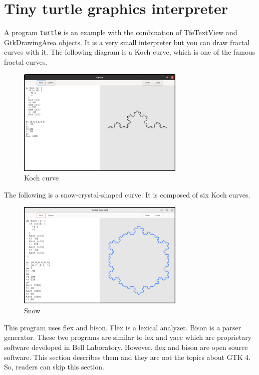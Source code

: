 \section{Tiny turtle graphics
interpreter}\label{tiny-turtle-graphics-interpreter}

A program \passthrough{\lstinline!turtle!} is an example with the
combination of TfeTextView and GtkDrawingArea objects. It is a very
small interpreter but you can draw fractal curves with it. The following
diagram is a Koch curve, which is one of the famous fractal curves.

\begin{figure}
\centering
\includegraphics[width=8cm,height=5.11cm]{../src/turtle/image/turtle_koch.png}
\caption{Koch curve}
\end{figure}

The following is a snow-crystal-shaped curve. It is composed of six Koch
curves.

\begin{figure}
\centering
\includegraphics[width=8cm,height=5.11cm]{../image/turtle_snow.png}
\caption{Snow}
\end{figure}

This program uses flex and bison. Flex is a lexical analyzer. Bison is a
parser generator. These two programs are similar to lex and yacc which
are proprietary software developed in Bell Laboratory. However, flex and
bison are open source software. This section describes them and they are
not the topics about GTK 4. So, readers can skip this section.

